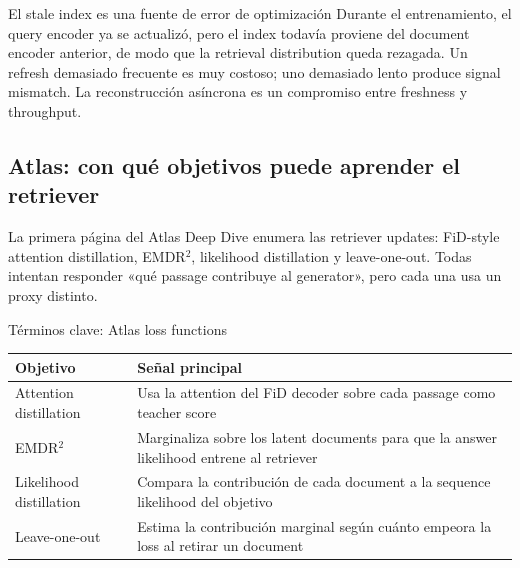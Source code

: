 \begin{warningbox}{El stale index es una fuente de error de optimización}
Durante el entrenamiento, el query encoder ya se actualizó, pero el index todavía proviene del document encoder anterior, de modo que la retrieval distribution queda rezagada. Un refresh demasiado frecuente es muy costoso; uno demasiado lento produce signal mismatch. La reconstrucción asíncrona es un compromiso entre freshness y throughput.
\end{warningbox}


\subsection{Atlas: con qué objetivos puede aprender el retriever}

La primera página del Atlas Deep Dive enumera las retriever updates: FiD-style attention distillation, EMDR$^2$, likelihood distillation y leave-one-out. Todas intentan responder «qué passage contribuye al generator», pero cada una usa un proxy distinto.


\begin{knowledgebox}{Términos clave: Atlas loss functions}
\begin{tabularx}{\textwidth}{L{0.22\textwidth}>{\raggedright\arraybackslash}X}
\toprule
Objetivo & Señal principal \\
\midrule
Attention distillation & Usa la attention del FiD decoder sobre cada passage como teacher score \\
EMDR$^2$ & Marginaliza sobre los latent documents para que la answer likelihood entrene al retriever \\
Likelihood distillation & Compara la contribución de cada document a la sequence likelihood del objetivo \\
Leave-one-out & Estima la contribución marginal según cuánto empeora la loss al retirar un document \\
\bottomrule
\end{tabularx}
\end{knowledgebox}

